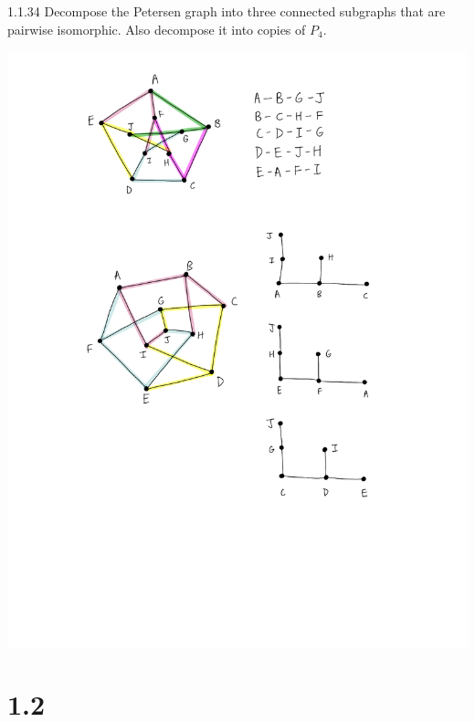 \documentclass[9pt]{extarticle}
\begin{document}
\begin{problem}{1.1.34}
    Decompose the Petersen graph into three connected subgraphs that are pairwise isomorphic. Also decompose it into copies of $P_4$.
    \tcblower
  \begin{center}
    \includegraphics[width = 15cm]{1_1_34.pdf}
  \end{center}
\end{problem}
\section*{1.2}%
\end{document}
